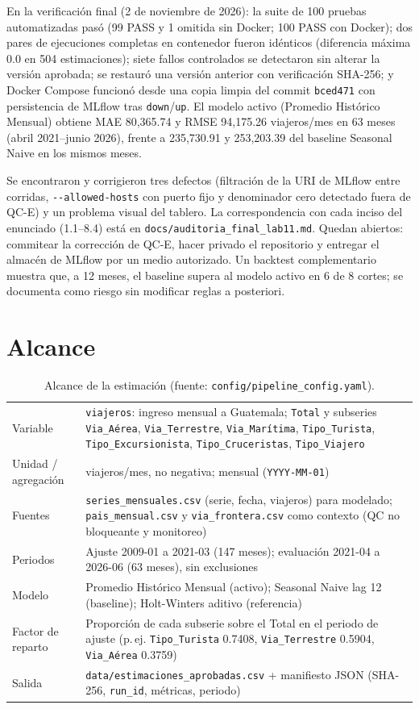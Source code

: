 \documentclass[11pt,a4paper]{article}
\newcommand{\cod}[1]{\texttt{\small #1}}
\begin{document}
En la verificación final (2 de noviembre de 2026): la suite de 100 pruebas automatizadas pasó (99 PASS y 1 omitida sin Docker; 100 PASS con Docker); dos pares de ejecuciones completas en contenedor fueron idénticos (diferencia máxima 0.0 en 504 estimaciones); siete fallos controlados se detectaron sin alterar la versión aprobada; se restauró una versión anterior con verificación SHA-256; y Docker Compose funcionó desde una copia limpia del commit \cod{bced471} con persistencia de MLflow tras \cod{down}/\cod{up}. El modelo activo (Promedio Histórico Mensual) obtiene MAE 80{,}365.74 y RMSE 94{,}175.26 viajeros/mes en 63 meses (abril 2021–junio 2026), frente a 235{,}730.91 y 253{,}203.39 del baseline Seasonal Naive en los mismos meses.

Se encontraron y corrigieron tres defectos (filtración de la URI de MLflow entre corridas, \cod{-{}-allowed-hosts} con puerto fijo y denominador cero detectado fuera de QC-E) y un problema visual del tablero. La correspondencia con cada inciso del enunciado (1.1--8.4) está en \cod{docs/auditoria\_final\_lab11.md}. Quedan abiertos: commitear la corrección de QC-E, hacer privado el repositorio y entregar el almacén de MLflow por un medio autorizado. Un backtest complementario muestra que, a 12 meses, el baseline supera al modelo activo en 6 de 8 cortes; se documenta como riesgo sin modificar reglas a posteriori.

\section{Alcance}
\begin{table}[H]\centering\small
\caption{Alcance de la estimación (fuente: \cod{config/pipeline\_config.yaml}).}
\begin{tabularx}{\textwidth}{@{}lL@{}}\toprule
Variable & \cod{viajeros}: ingreso mensual a Guatemala; \cod{Total} y subseries \cod{Via\_Aérea}, \cod{Via\_Terrestre}, \cod{Via\_Marítima}, \cod{Tipo\_Turista}, \cod{Tipo\_Excursionista}, \cod{Tipo\_Cruceristas}, \cod{Tipo\_Viajero}\\
Unidad / agregación & viajeros/mes, no negativa; mensual (\cod{YYYY-MM-01})\\
Fuentes & \cod{series\_mensuales.csv} (serie, fecha, viajeros) para modelado; \cod{pais\_mensual.csv} y \cod{via\_frontera.csv} como contexto (QC no bloqueante y monitoreo)\\
Periodos & Ajuste 2009-01 a 2021-03 (147 meses); evaluación 2021-04 a 2026-06 (63 meses), sin exclusiones\\
Modelo & Promedio Histórico Mensual (activo); Seasonal Naive lag 12 (baseline); Holt-Winters aditivo (referencia)\\
Factor de reparto & Proporción de cada subserie sobre el Total en el periodo de ajuste (p.\,ej. \cod{Tipo\_Turista} 0.7408, \cod{Via\_Terrestre} 0.5904, \cod{Via\_Aérea} 0.3759)\\
Salida & \cod{data/estimaciones\_aprobadas.csv} + manifiesto JSON (SHA-256, \cod{run\_id}, métricas, periodo)\\
\bottomrule\end{tabularx}
\end{table}
\end{document}
